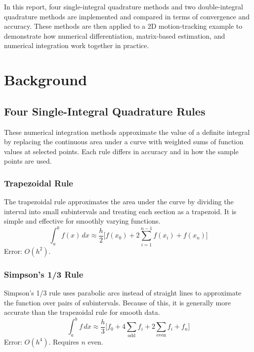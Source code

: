 \documentclass[letterpaper,twocolumn,fleqn]{article}
\begin{document}
In this report, four single-integral quadrature methods and two double-integral quadrature methods are implemented and compared in terms of convergence and accuracy. These methods are then applied to a 2D motion-tracking example to demonstrate how numerical differentiation, matrix-based estimation, and numerical integration work together in practice.


\section{Background}

\subsection{Four Single-Integral Quadrature Rules}

These numerical integration methods approximate the value of a definite integral by replacing the continuous area under a curve with weighted sums of function values at selected points. Each rule differs in accuracy and in how the sample points are used.

\subsubsection{Trapezoidal Rule}
The trapezoidal rule approximates the area under the curve by dividing the interval into small subintervals and treating each section as a trapezoid. It is simple and effective for smoothly varying functions.
\begin{equation}
  \int_a^b f(x)\,dx \approx \frac{h}{2}\bigl[f(x_0) + 2\textstyle\sum_{i=1}^{n-1} f(x_i) + f(x_n)\bigr]
  \label{eq:trap}
\end{equation}
Error: $O(h^2)$.

\subsubsection{Simpson's 1/3 Rule}
Simpson's 1/3 rule uses parabolic arcs instead of straight lines to approximate the function over pairs of subintervals. Because of this, it is generally more accurate than the trapezoidal rule for smooth data.
\begin{equation}
  \int_a^b f\,dx \approx \frac{h}{3}\bigl[f_0 + 4\textstyle\sum_{\text{odd}} f_i + 2\textstyle\sum_{\text{even}} f_i + f_n\bigr]
  \label{eq:s13}
\end{equation}
Error: $O(h^4)$. Requires $n$ even.
\end{document}
